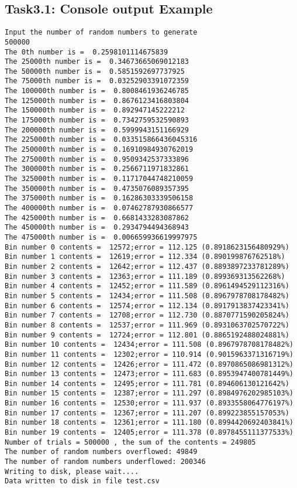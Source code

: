 \documentclass{article}
\begin{document}
\subsection{Task3.1: Console output Example}
\begin{lstlisting}
Input the number of random numbers to generate
500000
The 0th number is =  0.2598101114675839
The 25000th number is =  0.34673665069012183
The 50000th number is =  0.5851592697737925
The 75000th number is =  0.03252903391072359
The 100000th number is =  0.8008461936246785
The 125000th number is =  0.8676123416803804
The 150000th number is =  0.892947145222212
The 175000th number is =  0.7342759532590893
The 200000th number is =  0.5999943151166929
The 225000th number is =  0.033515866436045316
The 250000th number is =  0.16910984930762019
The 275000th number is =  0.9509342537333896
The 300000th number is =  0.2566711971832861
The 325000th number is =  0.11717044748210059
The 350000th number is =  0.4735076089357395
The 375000th number is =  0.16286303339506158
The 400000th number is =  0.07462787930866577
The 425000th number is =  0.6681433283087862
The 450000th number is =  0.2934794494368943
The 475000th number is =  0.006659936619997975
Bin number 0 contents =  12572;error = 112.125 (0.8918623156480929%)
Bin number 1 contents =  12619;error = 112.334 (0.890199876762518%)
Bin number 2 contents =  12642;error = 112.437 (0.8893897233781289%)
Bin number 3 contents =  12363;error = 111.189 (0.899369313562268%)
Bin number 4 contents =  12452;error = 111.589 (0.8961494529112316%)
Bin number 5 contents =  12434;error = 111.508 (0.8967978708178482%)
Bin number 6 contents =  12574;error = 112.134 (0.8917913837423341%)
Bin number 7 contents =  12708;error = 112.730 (0.8870771590205824%)
Bin number 8 contents =  12537;error = 111.969 (0.8931063702570722%)
Bin number 9 contents =  12724;error = 112.801 (0.8865192488024881%)
Bin number 10 contents =  12434;error = 111.508 (0.8967978708178482%)
Bin number 11 contents =  12302;error = 110.914 (0.9015963371316719%)
Bin number 12 contents =  12426;error = 111.472 (0.8970865086981312%)
Bin number 13 contents =  12473;error = 111.683 (0.8953947400781449%)
Bin number 14 contents =  12495;error = 111.781 (0.894606130121642%)
Bin number 15 contents =  12387;error = 111.297 (0.8984976202985103%)
Bin number 16 contents =  12530;error = 111.937 (0.8933558064776197%)
Bin number 17 contents =  12367;error = 111.207 (0.899223855157053%)
Bin number 18 contents =  12361;error = 111.180 (0.8994420692403841%)
Bin number 19 contents =  12405;error = 111.378 (0.8978455111377533%)
Number of trials = 500000 , the sum of the contents = 249805
The number of random numbers overflowed: 49849
The number of random numbers underflowed: 200346
Writing to disk, please wait....
Data written to disk in file test.csv
\end{lstlisting}
\end{document}
